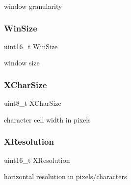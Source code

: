 window granularity 

\hypertarget{structvbe__mode__info__t_a78985f1c5ae166cb560099273cc558b4}{}\label{structvbe__mode__info__t_a78985f1c5ae166cb560099273cc558b4} 
\subsubsection{\texorpdfstring{Win\+Size}{WinSize}}
{\footnotesize\ttfamily uint16\+\_\+t Win\+Size}



window size 

\hypertarget{structvbe__mode__info__t_a047d8f41434f02589d0c9b90b17c67eb}{}\label{structvbe__mode__info__t_a047d8f41434f02589d0c9b90b17c67eb} 
\subsubsection{\texorpdfstring{X\+Char\+Size}{XCharSize}}
{\footnotesize\ttfamily uint8\+\_\+t X\+Char\+Size}



character cell width in pixels 

\hypertarget{structvbe__mode__info__t_a16f6408e5a85c7a7785a0cee64b6a219}{}\label{structvbe__mode__info__t_a16f6408e5a85c7a7785a0cee64b6a219} 
\subsubsection{\texorpdfstring{X\+Resolution}{XResolution}}
{\footnotesize\ttfamily uint16\+\_\+t X\+Resolution}



horizontal resolution in pixels/characters 

\hypertarget{structvbe__mode__info__t_a330f00ebd49dccd2325d43cdbd646f09}{}\label{structvbe__mode__info__t_a330f00ebd49dccd2325d43cdbd646f09} 
